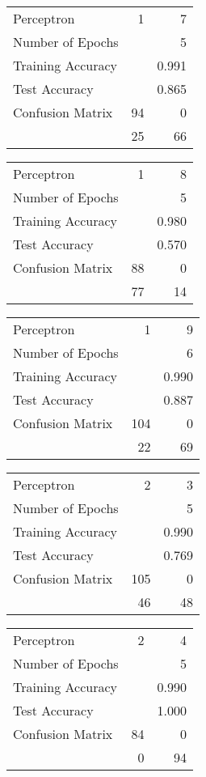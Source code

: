 \documentclass[11pt]{article}
\begin{document}
\begin{minipage}[t]{0.5\textwidth}
\begin{tabular}{|l | r r|}
\hline Perceptron & 1 & 7\\
Number of Epochs & & 5\\
Training Accuracy & & 0.991\\
Test Accuracy & & 0.865\\
Confusion Matrix & 94 & 0\\
 &25 & 66\\ \hline
\end{tabular}
\end{minipage}
\begin{minipage}[t]{0.5\textwidth}
\begin{tabular}{|l | r r|}
\hline Perceptron & 1 & 8\\
Number of Epochs & & 5\\
Training Accuracy & & 0.980\\
Test Accuracy & & 0.570\\
Confusion Matrix & 88 & 0\\
 &77 & 14\\ \hline
\end{tabular}
\end{minipage}
\begin{minipage}[t]{0.5\textwidth}
\begin{tabular}{|l | r r|}
\hline Perceptron & 1 & 9\\
Number of Epochs & & 6\\
Training Accuracy & & 0.990\\
Test Accuracy & & 0.887\\
Confusion Matrix & 104 & 0\\
 &22 & 69\\ \hline
\end{tabular}
\end{minipage}
\begin{minipage}[t]{0.5\textwidth}
\begin{tabular}{|l | r r|}
\hline Perceptron & 2 & 3\\
Number of Epochs & & 5\\
Training Accuracy & & 0.990\\
Test Accuracy & & 0.769\\
Confusion Matrix & 105 & 0\\
 &46 & 48\\ \hline
\end{tabular}
\end{minipage}
\begin{minipage}[t]{0.5\textwidth}
\begin{tabular}{|l | r r|}
\hline Perceptron & 2 & 4\\
Number of Epochs & & 5\\
Training Accuracy & & 0.990\\
Test Accuracy & & 1.000\\
Confusion Matrix & 84 & 0\\
 &0 & 94\\ \hline
\end{tabular}
\end{minipage}
\end{document}
